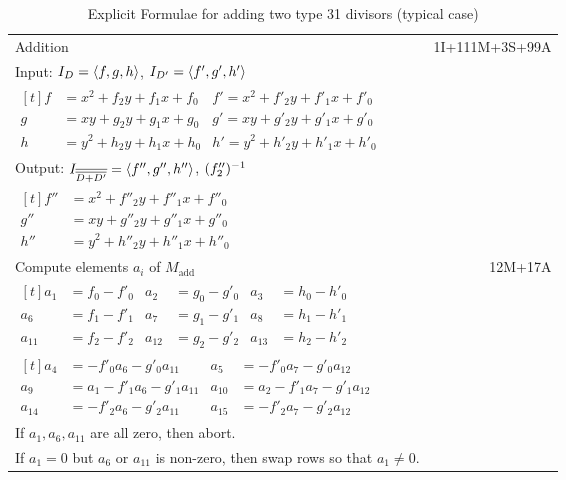 \begin{longtable}{|l|r|}
  \caption{Explicit Formulae for adding two type 31 divisors (typical case)\label{tab_add_31_31}}\\
  \hline
  Addition & 1I+111M+3S+99A \\
  Input: $I_D = \left\langle f, g, h \right\rangle$, $I_{D'} = \left\langle f',g',h' \right\rangle$ & \\
  $\begin{aligned}[t]
  f &= x^2 + f_2y + f_1x + f_0 & f' = x^2 + f'_2y + f'_1x + f'_0 \\
  g &=  xy + g_2y + g_1x + g_0 & g' =  xy + g'_2y + g'_1x + g'_0 \\
  h &= y^2 + h_2y + h_1x + h_0 & h' = y^2 + h'_2y + h'_1x + h'_0
  \end{aligned}$ & \\
  Output: $I_{\overline{\overline{D + D'}}} = \left\langle f'', g'', h'' \right\rangle$, $(f''_2)^{-1}$ & \\
  $\begin{aligned}[t]
  f'' &= x^2 + f''_2y + f''_1x + f''_0 \\
  g'' &=  xy + g''_2y + g''_1x + g''_0 \\
  h'' &= y^2 + h''_2y + h''_1x + h''_0 
  \end{aligned}$ & \\
  \hline \hline
  Compute elements $a_i$ of $M_{\text{add}}$ & 12M+17A \\
  \hline
  $\begin{aligned}[t]
    a_1    &= f_0 - f'_0 & a_2    &= g_0 - g'_0 & a_3    &= h_0 - h'_0 \\
    a_6    &= f_1 - f'_1 & a_7    &= g_1 - g'_1 & a_8    &= h_1 - h'_1 \\
    a_{11} &= f_2 - f'_2 & a_{12} &= g_2 - g'_2 & a_{13} &= h_2 - h'_2
  \end{aligned}$ & \\
  $\begin{aligned}[t]
    a_4    &=     - f'_0a_6 - g'_0a_{11} & a_5    &=     - f'_0a_7 - g'_0a_{12} \\
    a_9    &= a_1 - f'_1a_6 - g'_1a_{11} & a_{10} &= a_2 - f'_1a_7 - g'_1a_{12} \\
    a_{14} &=     - f'_2a_6 - g'_2a_{11} & a_{15} &=     - f'_2a_7 - g'_2a_{12}
  \end{aligned}$ & \\
  If $a_1, a_6, a_{11}$ are all zero, then abort. & \\
  If $a_1 = 0$ but $a_6$ or $a_{11}$ is non-zero, then swap rows so that $a_1 \neq 0$. & \\

\end{longtable}
